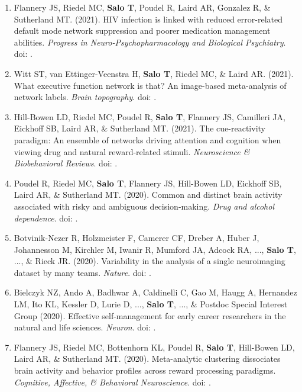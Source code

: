 \documentclass[10pt]{article}
\newcommand{\doi}[1]{doi: \textlink{https://doi.org/#1}{#1}}
\newcommand{\textlink}[3][blue]{\href{#2}{\color{#1}{#3}}}
\begin{document}
\begin{enumerate}
	\item Flannery JS, Riedel MC, \textbf{Salo T}, Poudel R, Laird AR, Gonzalez R, \& Sutherland MT.
	(2021).
	HIV infection is linked with reduced error-related default mode network suppression and poorer medication management abilities.
	\emph{Progress in Neuro-Psychopharmacology and Biological Psychiatry}.
	\doi{10.1016/j.pnpbp.2021.110398}.

	\item Witt ST, van Ettinger-Veenstra H, \textbf{Salo T}, Riedel MC, \& Laird AR.
	(2021).
	What executive function network is that? An image-based meta-analysis of network labels.
	\emph{Brain topography}.
	\doi{10.1007/s10548-021-00847-z}.

	\item Hill-Bowen LD, Riedel MC, Poudel R, \textbf{Salo T}, Flannery JS, Camilleri JA, Eickhoff SB, Laird AR, \& Sutherland MT.
	(2021).
	The cue-reactivity paradigm: An ensemble of networks driving attention and cognition when viewing drug and natural reward-related stimuli.
	\emph{Neuroscience \& Biobehavioral Reviews}.
	\doi{10.1016/j.neubiorev.2021.08.010}.

	\item Poudel R, Riedel MC, \textbf{Salo T}, Flannery JS, Hill-Bowen LD, Eickhoff SB, Laird AR, \& Sutherland MT.
	(2020).
	Common and distinct brain activity associated with risky and ambiguous decision-making.
	\emph{Drug and alcohol dependence}.
	\doi{10.1016/j.drugalcdep.2020.107884}.

	\item Botvinik-Nezer R, Holzmeister F, Camerer CF, Dreber A, Huber J, Johannesson M, Kirchler M, Iwanir R, Mumford JA, Adcock RA, ..., \textbf{Salo T}, ..., \& Rieck JR.
	(2020).
	Variability in the analysis of a single neuroimaging dataset by many teams.
	\emph{Nature}.
	\doi{10.1038/s41586-020-2314-9}.

	\item Bielczyk NZ, Ando A, Badhwar A, Caldinelli C, Gao M, Haugg A, Hernandez LM, Ito KL, Kessler D, Lurie D, ..., \textbf{Salo T}, ..., \& Postdoc Special Interest Group
	(2020).
	Effective self-management for early career researchers in the natural and life sciences.
	\emph{Neuron}.
	\doi{10.1016/j.neuron.2020.03.015}.

	\item Flannery JS, Riedel MC, Bottenhorn KL, Poudel R, \textbf{Salo T}, Hill-Bowen LD, Laird AR, \& Sutherland MT.
	(2020).
	Meta-analytic clustering dissociates brain activity and behavior profiles across reward processing paradigms.
	\emph{Cognitive, Affective, \& Behavioral Neuroscience}.
	\doi{10.3758/s13415-019-00763-7}.


\end{enumerate}
\end{document}
